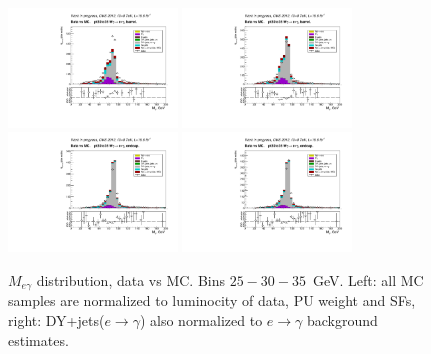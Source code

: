 \begin{figure}[htb]
\begin{center}
    \includegraphics[width=0.40\textwidth]{../figs/figs_v11/ELECTRON_WGamma/PrepareYields/c_TotalDATAvsMC_Barrel__Mpholep1PRELIMINARY_FOR_E_TO_GAMMA_WITH_PSV_CUT_pt30to35_.pdf} \includegraphics[width=0.40\textwidth]{../figs/figs_v11/ELECTRON_WGamma/PrepareYields/c_TotalDATAvsMC_Barrel__Mpholep1PRELIMINARY_FOR_E_TO_GAMMA_WITH_PSV_CUT_pt30to35__etogScale.pdf}   \\
    \includegraphics[width=0.40\textwidth]{../figs/figs_v11/ELECTRON_WGamma/PrepareYields/c_TotalDATAvsMC_Endcap__Mpholep1PRELIMINARY_FOR_E_TO_GAMMA_WITH_PSV_CUT_pt30to35_.pdf} \includegraphics[width=0.40\textwidth]{../figs/figs_v11/ELECTRON_WGamma/PrepareYields/c_TotalDATAvsMC_Endcap__Mpholep1PRELIMINARY_FOR_E_TO_GAMMA_WITH_PSV_CUT_pt30to35__etogScale.pdf}\\
   \label{fig:Mpholep1DatavsMC_25to35}
  \caption{$M_{e\gamma}$ distribution, data vs MC. Bins $25-30-35$~GeV. Left: all MC samples are normalized to luminocity of data, PU weight and SFs, right: DY+jets($e\rightarrow\gamma$) also normalized to $e\rightarrow\gamma$ background estimates.}
  \end{center}
\end{figure}


